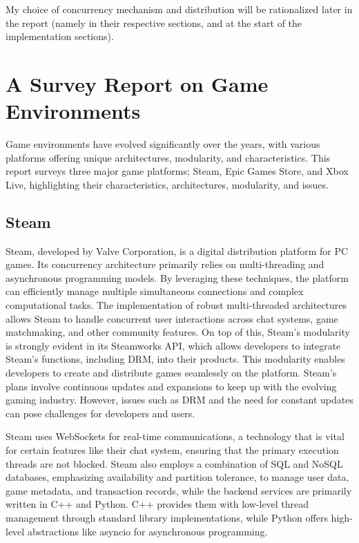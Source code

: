 \documentclass[]{final}
\begin{document}
My choice of concurrency mechanism and distribution will be
rationalized later in the report (namely in their respective sections,
and at the start of the implementation sections).

\chapter{A Survey Report on Game Environments}

\label{survey}

Game environments have evolved significantly over the years, with various platforms
offering unique architectures, modularity, and characteristics. This report surveys
three major game platforms; Steam, Epic Games Store, and Xbox Live, highlighting
their characteristics, architectures, modularity, and issues.

\section{Steam}
Steam, developed by Valve Corporation, is a digital distribution platform
for PC games. Its concurrency architecture primarily relies on multi-threading and asynchronous
programming models. By leveraging these techniques, the platform can efficiently manage
multiple simultaneous connections and complex computational tasks. The implementation
of robust multi-threaded architectures allows Steam to handle concurrent user interactions
across chat systems, game matchmaking, and other community features. On top of this,
Steam's modularity is strongly evident in its Steamworks API, which allows developers to
integrate Steam's functions, including DRM, into their products.\cite{simmons_decoding_2023, noauthor_steamworks_nodate}
This modularity enables developers to create and distribute games seamlessly on the platform.
Steam's plans involve continuous updates and expansions to keep up with
the evolving gaming industry.\cite{noauthor_steam_nodate1} However, issues such as DRM and the need for
constant updates can pose challenges for developers and users\cite{noauthor_steam_nodate}.

Steam uses WebSockets for real-time communications, a technology that is vital
for certain features like their chat system, ensuring that the primary execution threads are not blocked.\cite{noauthor_isteamnetworkingsockets_nodate}
Steam also employs a combination of SQL and NoSQL databases\cite{simmons_decoding_2023, djundik_how_2017}, emphasizing availability
and partition tolerance, to manage user data, game metadata, and transaction records, while
the backend services are primarily written in C++ and Python.\cite{simmons_decoding_2023}  C++ provides them with low-level thread management through standard
library implementations, while Python offers high-level abstractions like asyncio
for asynchronous programming.
\end{document}
